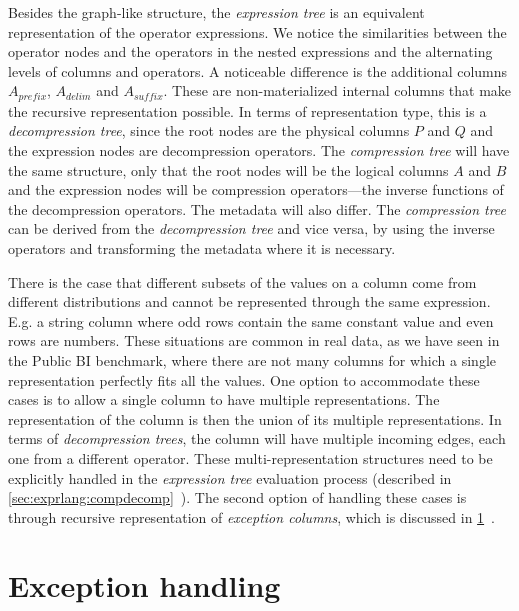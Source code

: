 Besides the graph-like structure, the \textit{expression tree} is an equivalent representation of the operator expressions. We notice the similarities between the operator nodes and the operators in the nested expressions and the alternating levels of columns and operators. A noticeable difference is the additional columns \(A_{\mathit{prefix}}\), \(A_{\mathit{delim}}\) and \(A_{\mathit{suffix}}\). These are non-materialized internal columns that make the recursive representation possible. In terms of representation type, this is a \textit{decompression tree}, since the root nodes are the physical columns \(P\) and \(Q\) and the expression nodes are decompression operators. The \textit{compression tree} will have the same structure, only that the root nodes will be the logical columns \(A\) and \(B\) and the expression nodes will be compression operators---the inverse functions of the decompression operators. The metadata will also differ. The \textit{compression tree} can be derived from the \textit{decompression tree} and vice versa, by using the inverse operators and transforming the metadata where it is necessary.

There is the case that different subsets of the values on a column come from different distributions and cannot be represented through the same expression. E.g. a string column where odd rows contain the same constant value and even rows are numbers. These situations are common in real data, as we have seen in the Public BI benchmark, where there are not many columns for which a single representation perfectly fits all the values. One option to accommodate these cases is to allow a single column to have multiple representations. The representation of the column is then the union of its multiple representations. In terms of \textit{decompression trees}, the column will have multiple incoming edges, each one from a different operator. These multi-representation structures need to be explicitly handled in the \textit{expression tree} evaluation process (described in \ref{sec:exprlang:compdecomp}~). The second option of handling these cases is through recursive representation of \textit{exception columns}, which is discussed in \ref{sec:exprlang:exceptions}~.

\section{Exception handling}
\label{sec:exprlang:exceptions}

